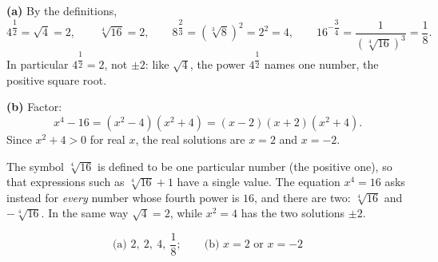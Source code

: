 \textbf{(a)} By the definitions,
\[4^{\dfrac12}=\sqrt4=2,\qquad\sqrt[4]{16}=2,\qquad8^{\dfrac23}=\left(\sqrt[3]{8}\right)^2=2^2=4,\qquad16^{-\dfrac34}=\dfrac{1}{\left(\sqrt[4]{16}\right)^3}=\dfrac{1}{8}.\]
In particular $4^{\dfrac12}=2$, not $\pm2$: like $\sqrt4$, the power $4^{\dfrac12}$ names one number, the positive square root.

\textbf{(b)} Factor:
\[x^4-16=\left(x^2-4\right)\left(x^2+4\right)=(x-2)(x+2)\left(x^2+4\right).\]
Since $x^2+4>0$ for real $x$, the real solutions are $x=2$ and $x=-2$.

The symbol $\sqrt[4]{16}$ is defined to be one particular number (the positive one), so that expressions such as $\sqrt[4]{16}+1$ have a single value. The equation $x^4=16$ asks instead for \emph{every} number whose fourth power is $16$, and there are two: $\sqrt[4]{16}$ and $-\sqrt[4]{16}$. In the same way $\sqrt4=2$, while $x^2=4$ has the two solutions $\pm2$.

\[\boxed{\text{(a) }2,\ 2,\ 4,\ \dfrac18;\qquad\text{(b) }x=2\text{ or }x=-2}\]
